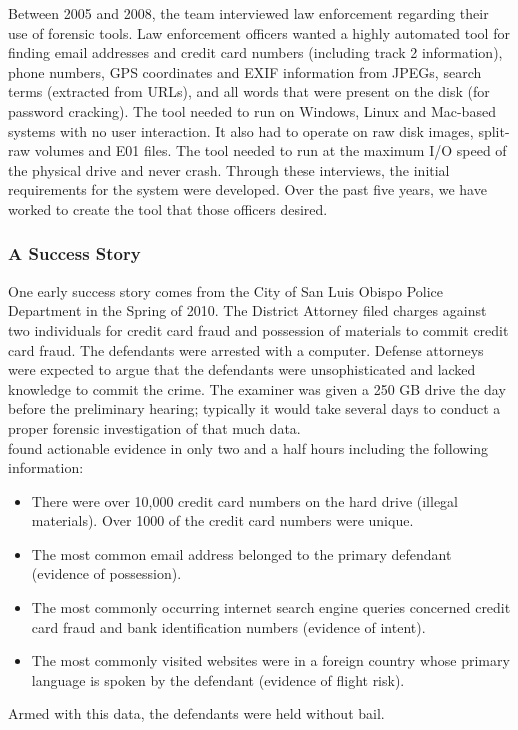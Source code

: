 \documentclass[11pt]{article} %
\begin{document}
Between 2005 and 2008, the \bulk team interviewed law enforcement regarding their use of forensic tools. Law enforcement officers wanted a highly automated tool for finding email addresses and credit card numbers (including track 2 information), phone numbers, GPS coordinates and EXIF information from JPEGs, search terms (extracted from URLs), and all words that were present on the disk (for password cracking). The tool needed to run on Windows, Linux and Mac-based systems with no user interaction. It also had to operate on raw disk images, split-raw volumes and E01 files. The tool needed to run at the maximum I/O speed of the physical drive and never crash. Through these interviews, the initial  requirements for the \bulk system were developed. Over the past five years, we have worked to create the tool that those officers desired. \\

\subsubsection{A \bulk Success Story}
One early \bulk success story comes from the City of San Luis Obispo Police Department in the Spring of 2010. The District Attorney filed charges against two individuals for credit card fraud and possession of materials to commit credit card fraud. The defendants were arrested with a computer. Defense attorneys were expected to argue that the defendants were unsophisticated and lacked knowledge to commit the crime. The examiner was given a 250 GB drive the day before the preliminary hearing; typically it would take several days to conduct a proper forensic investigation of that much data.\\

\bulk found actionable evidence in only two and a half hours including the following information:
\begin{itemize}
\item There were over 10,000 credit card numbers on the hard drive (illegal materials).  Over 1000 of the credit card numbers were unique. 
\item The most common email address belonged to the primary defendant (evidence of possession). 
\item The most commonly occurring internet search engine queries concerned credit card fraud and bank identification numbers (evidence of intent). 
\item The most commonly visited websites were in a foreign country whose primary language is spoken by the defendant (evidence of flight risk). 
\end{itemize}
Armed with this data, the defendants were held without bail.\\
\end{document}
